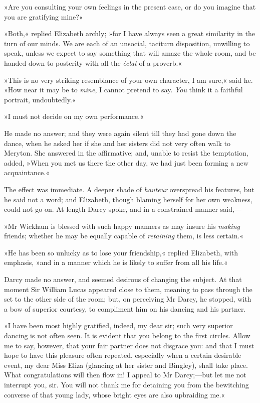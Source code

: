 »Are you consulting your own feelings in the present case, or do you imagine that you are gratifying mine?«

»Both,« replied Elizabeth archly; »for I have always seen a great similarity in the turn of our minds. We are each of an unsocial, taciturn disposition, unwilling to speak, unless we expect to say something that will amaze the whole room, and be handed down to posterity with all the \textit{éclat} of a proverb.«

»This is no very striking resemblance of your own character, I am sure,« said he. »How near it may be to \textit{mine}, I cannot pretend to say. \textit{You} think it a faithful portrait, undoubtedly.«

»I must not decide on my own performance.«

He made no answer; and they were again silent till they had gone down the dance, when he asked her if she and her sisters did not very often walk to Meryton. She answered in the affirmative; and, unable to resist the temptation, added, »When you met us there the other day, we had just been forming a new acquaintance.«

The effect was immediate. A deeper shade of \textit{hauteur} overspread his features, but he said not a word; and Elizabeth, though blaming herself for her own weakness, could not go on. At length Darcy spoke, and in a constrained manner said,—

»Mr Wickham is blessed with such happy manners as may insure his \textit{making} friends; whether he may be equally capable of \textit{retaining} them, is less certain.«

»He has been so unlucky as to lose your friendship,« replied Elizabeth, with emphasis, »and in a manner which he is likely to suffer from all his life.«

Darcy made no answer, and seemed desirous of changing the subject. At that moment Sir William Lucas appeared close to them, meaning to pass through the set to the other side of the room; but, on perceiving Mr Darcy, he stopped, with a bow of superior courtesy, to compliment him on his dancing and his partner.

»I have been most highly gratified, indeed, my dear sir; such very superior dancing is not often seen. It is evident that you belong to the first circles. Allow me to say, however, that your fair partner does not disgrace you: and that I must hope to have this pleasure often repeated, especially when a certain desirable event, my dear Miss Eliza (glancing at her sister and Bingley), shall take place. What congratulations will then flow in! I appeal to Mr Darcy;—but let me not interrupt you, sir. You will not thank me for detaining you from the bewitching converse of that young lady, whose bright eyes are also upbraiding me.«


